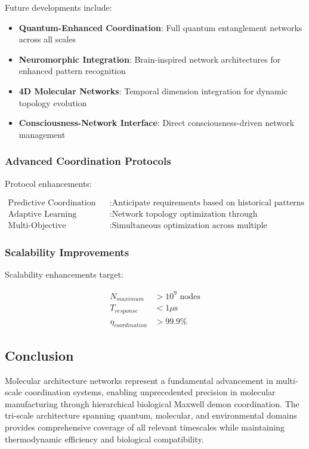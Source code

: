 Future developments include:

\begin{itemize}
\item \textbf{Quantum-Enhanced Coordination}: Full quantum entanglement networks across all scales
\item \textbf{Neuromorphic Integration}: Brain-inspired network architectures for enhanced pattern recognition
\item \textbf{4D Molecular Networks}: Temporal dimension integration for dynamic topology evolution
\item \textbf{Consciousness-Network Interface}: Direct consciousness-driven network management
\end{itemize}

\subsubsection{Advanced Coordination Protocols}

Protocol enhancements:

\begin{align}
\text{Predictive Coordination} &: \text{Anticipate requirements based on historical patterns} \\
\text{Adaptive Learning} &: \text{Network topology optimization through reinforcement learning} \\
\text{Multi-Objective Optimization} &: \text{Simultaneous optimization across multiple performance metrics}
\end{align}

\subsubsection{Scalability Improvements}

Scalability enhancements target:

\begin{align}
N_{maximum} &> 10^9 \text{ nodes} \\
T_{response} &< 1 \mu\text{s} \\
\eta_{coordination} &> 99.9\%
\end{align}

\subsection{Conclusion}

Molecular architecture networks represent a fundamental advancement in multi-scale coordination systems, enabling unprecedented precision in molecular manufacturing through hierarchical biological Maxwell demon coordination. The tri-scale architecture spanning quantum, molecular, and environmental domains provides comprehensive coverage of all relevant timescales while maintaining thermodynamic efficiency and biological compatibility.

